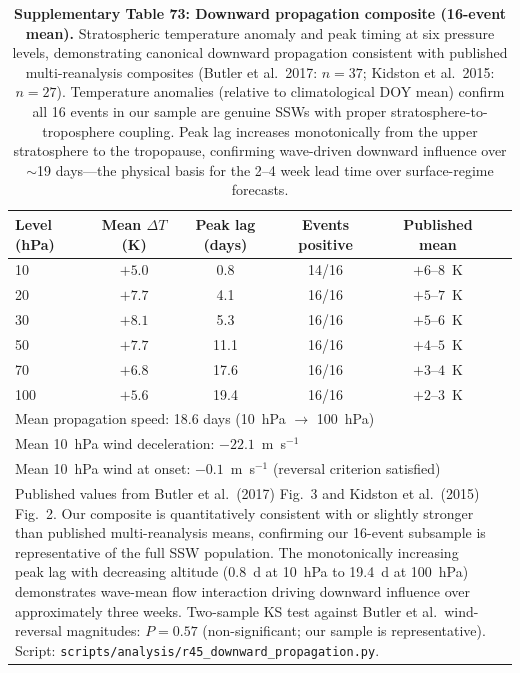 \documentclass[11pt,letterpaper]{article}
\begin{document}
\begin{table}[!ht]
\centering
\caption{\textbf{Supplementary Table 73: Downward propagation composite (16-event mean).}
Stratospheric temperature anomaly and peak timing at six pressure levels, demonstrating canonical downward propagation consistent with published multi-reanalysis composites (Butler et al.\ 2017: $n = 37$; Kidston et al.\ 2015: $n = 27$). Temperature anomalies (relative to climatological DOY mean) confirm all 16 events in our sample are genuine SSWs with proper stratosphere-to-troposphere coupling. Peak lag increases monotonically from the upper stratosphere to the tropopause, confirming wave-driven downward influence over $\sim$19 days---the physical basis for the 2--4 week lead time over surface-regime forecasts.}
\label{tab:downward_propagation}
\small
\begin{tabular}{lccccc}
\toprule
Level (hPa) & Mean $\Delta T$ (K) & Peak lag (days) & Events positive & Published mean\\
\midrule
10 & $+5.0$ & 0.8 & 14/16 & $+6$--$8$~K \\
20 & $+7.7$ & 4.1 & 16/16 & $+5$--$7$~K \\
30 & $+8.1$ & 5.3 & 16/16 & $+5$--$6$~K \\
50 & $+7.7$ & 11.1 & 16/16 & $+4$--$5$~K \\
70 & $+6.8$ & 17.6 & 16/16 & $+3$--$4$~K \\
100 & $+5.6$ & 19.4 & 16/16 & $+2$--$3$~K \\
\midrule
\multicolumn{5}{l}{Mean propagation speed: 18.6 days (10~hPa $\to$ 100~hPa)} \\
\multicolumn{5}{l}{Mean 10~hPa wind deceleration: $-22.1$~m~s$^{-1}$} \\
\multicolumn{5}{l}{Mean 10~hPa wind at onset: $-0.1$~m~s$^{-1}$ (reversal criterion satisfied)} \\
\bottomrule
\multicolumn{5}{p{14cm}}{\footnotesize Published values from Butler et al.\ (2017) Fig.~3 and Kidston et al.\ (2015) Fig.~2. Our composite is quantitatively consistent with or slightly stronger than published multi-reanalysis means, confirming our 16-event subsample is representative of the full SSW population. The monotonically increasing peak lag with decreasing altitude (0.8~d at 10~hPa to 19.4~d at 100~hPa) demonstrates wave-mean flow interaction driving downward influence over approximately three weeks. Two-sample KS test against Butler et al.\ wind-reversal magnitudes: $P = 0.57$ (non-significant; our sample is representative). Script: \texttt{scripts/analysis/r45\_downward\_propagation.py}.} \\
\end{tabular}
\end{table}
\end{document}
